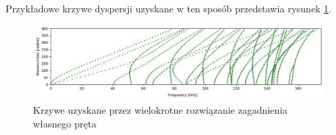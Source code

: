 Przykładowe krzywe dyspersji uzyskane w ten sposób przedstawia rysunek \ref{fig:przykladowe_krzywe}.

\begin{figure}[h]
\centering
\includegraphics[width=14cm]{Zdjecia/2/przykladowe_krzywe}
\caption{Krzywe uzyskane przez wielokrotne rozwiązanie zagadnienia własnego pręta}
\label{fig:przykladowe_krzywe}
\end{figure}

